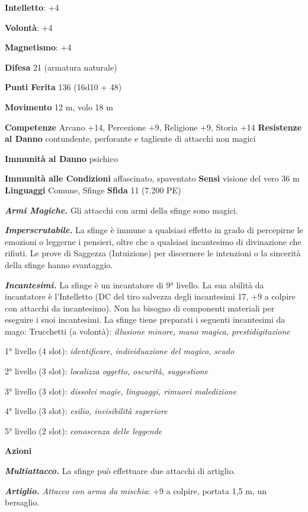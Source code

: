 \begin{multicols}{2}
\textbf{Intelletto}: +4

\textbf{Volontà}: +4

\textbf{Magnetismo}: +4

\textbf{Difesa} 21 (armatura naturale)

\textbf{Punti Ferita} 136 (16d10 + 48)

\textbf{Movimento} 12 m, volo 18 m

\textbf{Competenze} Arcano +14, Percezione +9, Religione +9, Storia +14
\textbf{Resistenze al Danno} contundente, perforante e tagliente di
attacchi non magici

\textbf{Immunità al Danno} psichico

\textbf{Immunità alle Condizioni} affascinato, spaventato \textbf{Sensi}
visione del vero 36 m \textbf{Linguaggi} Comune,
Sfinge \textbf{Sfida} 11 (7.200 PE)

\emph{\textbf{Armi Magiche.}} Gli attacchi con armi della sfinge sono
magici.

\emph{\textbf{Imperscrutabile.}} La sfinge è immune a qualsiasi effetto
in grado di percepirne le emozioni o leggerne i pensieri, oltre che a
qualsiasi incantesimo di divinazione che rifiuti. Le prove di Saggezza
(Intuizione) per discernere le intenzioni o la sincerità della sfinge
hanno svantaggio.

\emph{\textbf{Incantesimi.}} La sfinge è un incantatore di 9° livello.
La sua abilità da incantatore è l'Intelletto (DC del tiro salvezza
degli incantesimi 17, +9 a colpire con attacchi da incantesimo). Non ha
bisogno di componenti materiali per eseguire i suoi incantesimi. La
sfinge tiene preparati i seguenti incantesimi da mago: Trucchetti (a
volontà): \emph{illusione minore, mano magica,} \emph{prestidigitazione}

1° livello (4 slot): \emph{identificare, individuazione del magico,
scudo}

2° livello (3 slot): \emph{localizza oggetto, oscurità, suggestione}

3° livello (3 slot): \emph{dissolvi magie, linguaggi, rimuovi
maledizione}

4° livello (3 slot): \emph{esilio, invisibilità superiore}

5° livello (2 slot): \emph{conoscenza delle leggende}

\textbf{Azioni}

\emph{\textbf{Multiattacco.}} La sfinge può effettuare due attacchi di
artiglio.

\emph{\textbf{Artiglio.} Attacco con arma da mischia}: +9 a colpire,
portata 1,5 m, un bersaglio.


\end{multicols}
